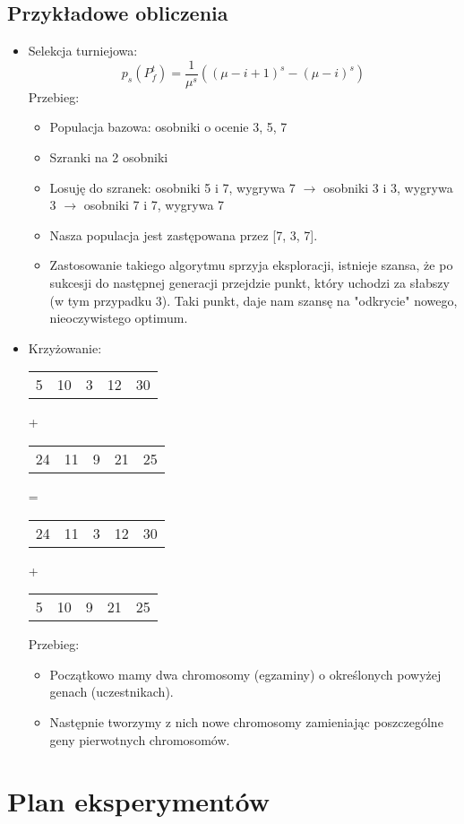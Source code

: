 \documentclass{article}
\begin{document}
\subsection{Przykładowe obliczenia}
\begin{itemize}
    \item Selekcja turniejowa:
\[
     p_{s}(P_{f}^{t}) = \frac{1}{\mu^{s}}((\mu - i + 1)^{s} - (\mu - i)^{s})
\]
Przebieg:
\begin{itemize}
    \item Populacja bazowa: osobniki o ocenie 3, 5, 7
    \item Szranki na 2 osobniki
    \item Losuję do szranek: osobniki 5 i 7, wygrywa 7 $\rightarrow$ osobniki 3 i 3, wygrywa 3 $\rightarrow$ osobniki 7 i 7, wygrywa 7
    \item Nasza populacja jest zastępowana przez [7, 3, 7].
    \item Zastosowanie takiego algorytmu sprzyja eksploracji, istnieje szansa, że po sukcesji do następnej generacji przejdzie punkt, który uchodzi za słabszy (w tym przypadku 3). Taki punkt, daje nam szansę na "odkrycie" nowego, nieoczywistego optimum.
\end{itemize}
\item Krzyżowanie:
\begin{table}[h]
\centering
\begin{tabular}{lllll}
5 & 10 & 3 & 12 & 30
\end{tabular}
+
\begin{tabular}{lllll}
24 & 11 & 9 & 21 & 25
\end{tabular}
=
\begin{tabular}{lllll}
24 & 11 & 3 & 12 & 30
\end{tabular}
+
\begin{tabular}{lllll}
5 & 10 & 9 & 21 & 25
\end{tabular}
\end{table}

Przebieg:
\begin{itemize}
\item Początkowo mamy dwa chromosomy (egzaminy) o określonych powyżej genach (uczestnikach).
\item Następnie tworzymy z nich nowe chromosomy zamieniając poszczególne geny pierwotnych chromosomów.
\end{itemize}
\end{itemize}
\section{Plan eksperymentów} 
\end{document}
